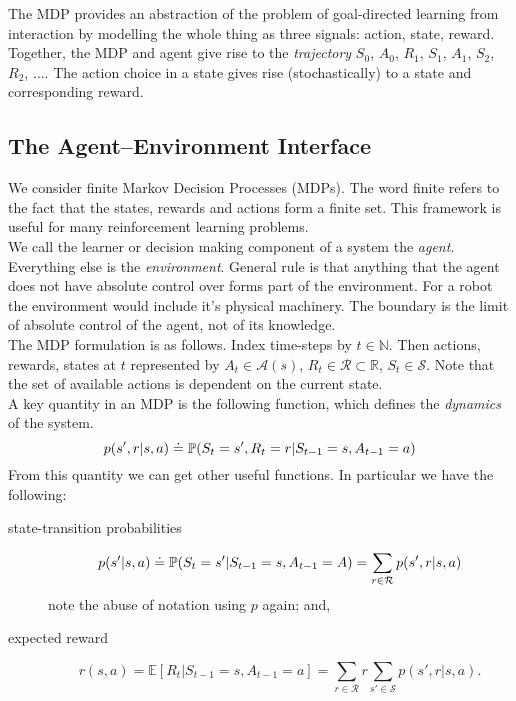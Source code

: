 The MDP provides an abstraction of the problem of goal-directed learning from interaction by modelling the whole thing as three signals: action, state, reward.\\

Together, the MDP and agent give rise to the \emph{trajectory} $S_0$, $A_0$, $R_1$, $S_1$, $A_1$, $S_2$, $R_2$, $\dots$. The action choice in a state gives rise (stochastically) to a state and corresponding reward.

\subsection{The Agent–Environment Interface}
We consider finite Markov Decision Processes (MDPs). The word finite refers to the fact that the states, rewards and actions form a finite set. This framework is useful for many reinforcement learning problems.\\

We call the learner or decision making component of a system the \emph{agent}. Everything else is the \emph{environment}. General rule is that anything that the agent does not have absolute control over forms part of the environment. For a robot the environment would include it's physical machinery. The boundary is the limit of absolute control of the agent, not of its knowledge.\\

The MDP formulation is as follows. Index time-steps by $t \in \mathbb{N}$. Then actions, rewards, states at $t$ represented by $A_t \in \mathcal{A}(s)$, $R_t \in \mathcal{R} \subset \mathbb{R}$, $S_t \in \mathcal{S}$. Note that the set of available actions is dependent on the current state.\\

A key quantity in an MDP is the following function, which defines the \emph{dynamics} of the system.
\begin{equation}
    p(s', r | s, a) \doteq \P{} (S_t = s', R_t = r | S_{t-1} = s, A_{t-1} = a)
\end{equation}
From this quantity we can get other useful functions. In particular we have the following: 

\begin{description}
    \item[state-transition probabilities]
\begin{equation}
    p(s' | s, a) \doteq \P{}(S_t = s'| S_{t-1} = s, A_{t-1}=A) = \sum_{r \in \mathcal{R}} p(s', r | s, a)
\end{equation}
note the abuse of notation using $p$ again; and,
    \item[expected reward]
\begin{equation}
    r(s, a) = \mathbb{E}[R_t | S_{t-1} = s, A_{t-1} = a] = \sum_{r \in \mathcal{R}} r \sum_{s' \in \mathcal{S}} p(s', r | s, a).
\end{equation}
\end{description}


